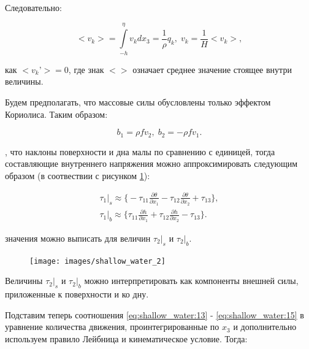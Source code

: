 \documentclass[14pt]{extreport}
\begin{document}
Следовательно:

\begin{equation}\label{eq:shallow_water:14}
<v_k>=\int\limits^\eta_{-h} v_k dx_3 = \frac{1}{\rho} q_k, \; v_k=\frac{1}{H}<v_k>,
\end{equation}

 как $<v_k’> = 0$, где знак $<>$ означает среднее значение стоящее внутри величины.

Будем предполагать, что массовые силы обусловлены только эффектом Кориолиса. Таким образом:

\begin{equation}\label{eq:shallow_water:15}
b_1 = \rho f v_2, \; b_2 = - \rho f v_1.
\end{equation}

, что наклоны поверхности и дна малы по сравнению с единицей, тогда составляющие внутреннего напряжения можно аппроксимировать следующим образом (в соотвествии с рисунком \ref{img:shallow_water:2}):

\begin{equation}\label{eq:shallow_water:16}
\begin{aligned}
 \tau_1\bigg|_s \approx \bigg\{ -\tau_{11}\frac{\partial \theta}{\partial x_1} -\tau_{12}\frac{\partial \theta}{\partial x_2} +\tau_{13}\bigg\}, \\
\tau_1\bigg|_b \approx \bigg\{ \tau_{11}\frac{\partial h}{\partial x_1} +\tau_{12}\frac{\partial h}{\partial x_2} -\tau_{13}\bigg\}.
\end{aligned}
\end{equation}

 значения можно выписать для величин $\tau_2|_s$ и $\tau_2|_b$.

\begin{figure}[H]
\centerline{
\texttt{[image: images/shallow\_water\_2]}}
\caption{}
\label{img:shallow_water:2}
\end{figure}


Величины $\tau_2|_s$ и $\tau_2|_b$ можно интерпретировать как компоненты внешней силы, приложенные к поверхности и ко дну.

Подставим теперь соотношения \ref{eq:shallow_water:13} - \ref{eq:shallow_water:15} в уравнение количества движения, проинтегрированные по $x_3$ и дополнительно используем правило Лейбница и кинематическое условие. Тогда:
\end{document}
